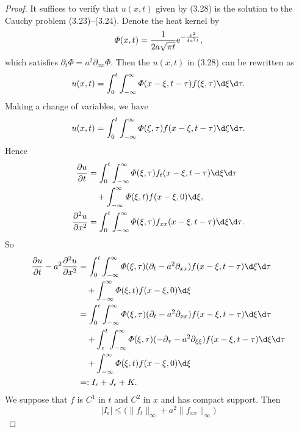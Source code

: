 \begin{proof}
  It suffices to verify that $u(x,t)$ given by (3.28) is the solution to
  the Cauchy problem (3.23)--(3.24). Denote the heat kernel by
  \[ \varPhi(x,t) = \frac{1}{2a\sqrt{\pi t}} \mathrm{e}^{-\frac{x^2}{4a^2t}}, \]
  which satisfies $\partial_t\varPhi = a^2\partial_{xx}\varPhi$. Then
  the $u(x,t)$ in (3.28) can be rewritten as
  \begin{equation}\label{eq:d1}
    u(x,t) = \int_0^t\int_{-\infty}^\infty \varPhi(x-\xi, t-\tau) f(\xi,\tau) \d\xi\d\tau.
  \end{equation}
  Making a change of variables, we have
  \begin{equation}\label{eq:d2}
    u(x,t) = \int_0^t\int_{-\infty}^\infty \varPhi(\xi,\tau) f(x-\xi,t-\tau) \d\xi\d\tau.
  \end{equation}
  Hence
  \begin{align}
    \frac{\partial u}{\partial t}
    & = \int_0^t\int_{-\infty}^\infty \varPhi(\xi,\tau) f_t(x-\xi,t-\tau) \d\xi\d\tau \notag \\
    &   \quad + \int_{-\infty}^\infty \varPhi(\xi,t)f(x-\xi,0) \d\xi, \\
    \frac{\partial^2u}{\partial x^2}
    & = \int_0^t \int_{-\infty}^\infty \varPhi(\xi,\tau) f_{xx}(x-\xi,t-\tau) \d\xi\d\tau.
  \end{align}
  So
  \begin{align*}
    \frac{\partial u}{\partial t} - a^2\frac{\partial^2u}{\partial x^2}
    & = \int_0^t \int_{-\infty}^\infty \varPhi(\xi,\tau) (\partial_t - a^2\partial_{xx})
        f(x-\xi,t-\tau) \d\xi\d\tau \\
    &   \quad + \int_{-\infty}^\infty \varPhi(\xi,t) f(x-\xi,0) \d\xi \\
    & = \int_0^\epsilon \int_{-\infty}^\infty \varPhi(\xi,\tau) (\partial_t - a^2\partial_{xx})
        f(x-\xi,t-\tau) \d\xi\d\tau \\
    &   \quad + \int_\epsilon^t \int_{-\infty}^\infty \varPhi(\xi,\tau) (-\partial_\tau - a^2\partial_{\xi\xi})
        f(x-\xi,t-\tau) \d\xi\d\tau \\
    &   \quad + \int_{-\infty}^\infty \varPhi(\xi,t) f(x-\xi,0) \d\xi \\
    & =: I_\epsilon + J_\epsilon + K.
  \end{align*}
  We suppose that $f$ is $C^1$ in $t$ and $C^2$ in $x$ and has compact support.
  Then
  \begin{equation}\label{eq:d3}
    |I_\epsilon| \leq \bigl(\|f_t\|_\infty + a^2 \|f_{xx}\|_\infty\bigr)

\end{equation}
\end{proof}
